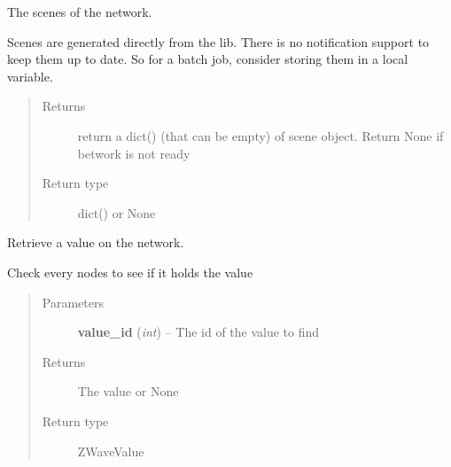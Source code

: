 \documentclass[letterpaper,10pt,english]{sphinxmanual}
\begin{document}
\begin{fulllineitems}
\begin{fulllineitems}
\end{fulllineitems}


\begin{fulllineitems}
\label{network:openzwave.network.ZWaveNetwork.get_scenes}
The scenes of the network.

Scenes are generated directly from the lib. There is no notification
support to keep them up to date. So for a batch job, consider
storing them in a local variable.
\begin{quote}\begin{description}
\item[{Returns}] \leavevmode
return a dict() (that can be empty) of scene object. Return None if betwork is not ready

\item[{Return type}] \leavevmode
dict() or None

\end{description}\end{quote}

\end{fulllineitems}


\begin{fulllineitems}
\label{network:openzwave.network.ZWaveNetwork.get_value}
Retrieve a value on the network.

Check every nodes to see if it holds the value
\begin{quote}\begin{description}
\item[{Parameters}] \leavevmode
\textbf{value\_id} (\emph{int}) -- The id of the value to find

\item[{Returns}] \leavevmode
The value or None

\item[{Return type}] \leavevmode
ZWaveValue

\end{description}\end{quote}

\end{fulllineitems}



\end{fulllineitems}
\end{document}
